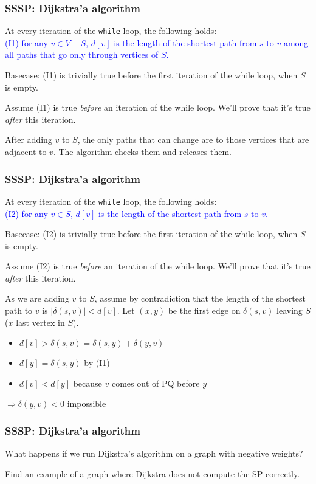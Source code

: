   \begin{frame}[fragile]
  \frametitle{SSSP: Dijkstra'a algorithm}
At every iteration of the \texttt{while} loop, the following holds: \\
\textcolor{blue}{(I1) for any $v \in V-S$, $d[v]$ is the length of the shortest
  path from $s$ to $v$ among all paths that go only through vertices
  of $S$.}

 
Basecase: (I1) is trivially true before the first iteration of the
while loop, when $S$ is empty.

Assume (I1) is true \emph{before} an iteration of the while loop.
We'll prove that it's true \emph{after} this iteration.
 
After adding $v$ to $S$, the only paths that can change are to those
vertices that are adjacent to $v$. The algorithm checks them and
releases them.
\end{frame} 





  \begin{frame}[fragile]
  \frametitle{SSSP: Dijkstra'a algorithm}
At every iteration of the \texttt{while} loop, the following holds: \\
\textcolor{blue} {(I2) for any $v \in S$, $d[v]$ is the length of the shortest path from $s$ to $v$. }
 
Basecase: (I2) is trivially true before the first iteration of the
while loop, when $S$ is empty.

Assume (I2) is true \emph{before} an iteration of the while loop.
We'll prove that it's true \emph{after} this iteration.
 

As we are adding $v$ to $S$, assume by contradiction that the length
of the shortest path to $v$ is $|\delta(s,v)| < d[v]$.  Let $(x,y)$ be the
first edge on $\delta(s,v)$ leaving $S$ ($x$ last vertex in $S$).

\begin{itemize} 
\item $d[v] > \delta(s,v) = \delta(s,y) + \delta(y,v)$
\item $d[y] = \delta(s,y)$  by (I1)
\item $d[v] < d[y]$ because $v$ comes out of PQ before $y$
\end{itemize}
$\Rightarrow \delta(y,v) < 0$ impossible
\end{frame} 



  \begin{frame}[fragile]
  \frametitle{SSSP: Dijkstra'a algorithm}

What happens if we run Dijkstra's algorithm on a graph with negative weights? 



Find an example of a graph where Dijkstra does not compute the SP correctly.



\end{frame} 


